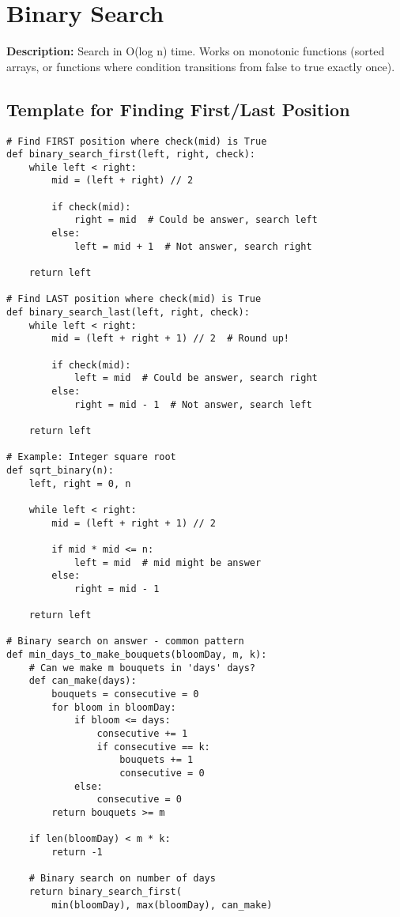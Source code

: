 \section{Binary Search}

\textbf{Description:} Search in O(log n) time. Works on monotonic functions (sorted arrays, or functions where condition transitions from false to true exactly once).

\subsection{Template for Finding First/Last Position}

\begin{lstlisting}
# Find FIRST position where check(mid) is True
def binary_search_first(left, right, check):
    while left < right:
        mid = (left + right) // 2
        
        if check(mid):
            right = mid  # Could be answer, search left
        else:
            left = mid + 1  # Not answer, search right
    
    return left

# Find LAST position where check(mid) is True
def binary_search_last(left, right, check):
    while left < right:
        mid = (left + right + 1) // 2  # Round up!
        
        if check(mid):
            left = mid  # Could be answer, search right
        else:
            right = mid - 1  # Not answer, search left
    
    return left

# Example: Integer square root
def sqrt_binary(n):
    left, right = 0, n
    
    while left < right:
        mid = (left + right + 1) // 2
        
        if mid * mid <= n:
            left = mid  # mid might be answer
        else:
            right = mid - 1
    
    return left

# Binary search on answer - common pattern
def min_days_to_make_bouquets(bloomDay, m, k):
    # Can we make m bouquets in 'days' days?
    def can_make(days):
        bouquets = consecutive = 0
        for bloom in bloomDay:
            if bloom <= days:
                consecutive += 1
                if consecutive == k:
                    bouquets += 1
                    consecutive = 0
            else:
                consecutive = 0
        return bouquets >= m
    
    if len(bloomDay) < m * k:
        return -1
    
    # Binary search on number of days
    return binary_search_first(
        min(bloomDay), max(bloomDay), can_make)
\end{lstlisting}
